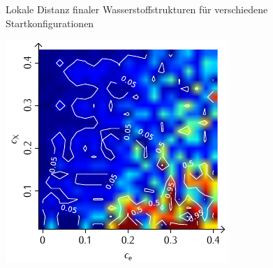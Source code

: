 \documentclass[a4paper, 10pt, twoside, openany]{book} %
\begin{document}
\begin{figure}
\begin{minipage}[t]{0.48\textwidth}
			\label{H_penalty_individual_D}
		\end{minipage}
		\caption[Lokale Distanz finaler Wasserstoffstrukturen]{Lokale Distanz finaler Wasserstoffstrukturen für verschiedene Startkonfigurationen}
		\label{H_D}
	\end{figure}
	
	\begin{figure}
		\begin{minipage}[t]{0.48\textwidth}
			\includegraphics[width=\textwidth]{Abbildungen/Phasendiagramme/Konturen/H_cluster_P.pdf}
			\label{H_cluster_P}
		\end{minipage}
		\hfill
		\begin{minipage}[t]{0.48\textwidth}

\end{minipage}
\end{figure}
\end{document}
